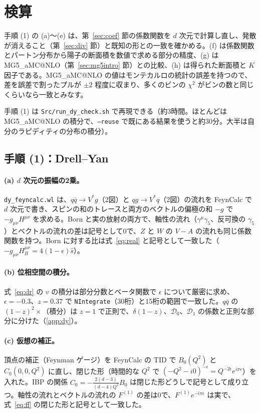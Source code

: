 \documentclass[a4paper,10pt]{ltjsarticle}
\makeatletter
\newcommand{\MGaMC}{MG5\_aMC@NLO}
\makeatother
\begin{document}
\section{検算}\label{sec:checks}

手順 (1) の (a)〜(e) は、第~\ref{sec:coef} 節の係数関数を $d$ 次元で計算し直し、発散が消えること（第~\ref{sec:div} 節）と既知の形との一致を確かめる。(f) は係数関数とパートン分布から陽子の断面積を数値で求める部分の精度、(g) は \MGaMC{}（第~\ref{sec:mg5intro} 節）との比較、(h) は得られた断面積と $K$ 因子である。\MGaMC{} の値はモンテカルロの統計の誤差を持つので、差を誤差で割ったプルが $\pm2$ 程度に収まり、多くのビンの $\chi^2$ がビンの数と同じくらいなら一致とみなす。

手順 (1) は \texttt{Src/run\_dy\_check.sh} で再現できる（約3時間。ほとんどは \MGaMC{} の積分で、\texttt{--reuse} で既にある結果を使うと約30分。大半は自分のラピディティの分布の積分）。

\subsection{手順 (1)：Drell--Yan}\label{sec:step1}

\paragraph{(a) $d$ 次元の振幅の2乗。}\texttt{dy\_feyncalc.wl} は、$q\bar q\to V^*g$（2図）と $qg\to V^*q$（2図）の流れを FeynCalc で $d$ 次元で書き、スピンの和のトレースと両方のベクトルの偏極の和 $-g$ で $-g_{\mu\nu}H^{\mu\nu}$ を求める。Born と実の放射の両方で、軸性の流れ（$\gamma^\mu\gamma_5$、反可換の $\gamma_5$）とベクトルの流れの差は記号として0で、$Z$ と $W$ の $V-A$ の流れも同じ係数関数を持つ。Born に対する比は式~\eqref{eq:real} と記号として一致した（$-g_{\mu\nu}H_B^{\mu\nu}=4(1-\epsilon)\hat s$）。

\paragraph{(b) 位相空間の積分。}式~\eqref{eq:dr} の $v$ の積分は部分分数とベータ関数で $\epsilon$ について厳密に求め、$\epsilon=-0.3$、$z=0.37$ で \texttt{NIntegrate}（30桁）と15桁の範囲で一致した。$q\bar q$ の $(1-z)^2\times$（積分）は $z=1$ で正則で、$\delta(1-z)$、$\mathcal D_0$、$\mathcal D_1$ の係数と正則な部分に分けた（\ref{app:dy}）。

\paragraph{(c) 仮想の補正。}頂点の補正（Feynman ゲージ）を FeynCalc の TID で $B_0(Q^2)$ と $C_0(0,0,Q^2)$ に直し、閉じた形（時間的な $Q^2$ で $(-Q^2-i0)^{-\epsilon}=Q^{-2\epsilon}e^{i\pi\epsilon}$）を入れた。IBP の関係 $C_0=-\frac{2(d-3)}{(d-4)Q^2}B_0$ は閉じた形どうしで記号として成り立つ。軸性の流れとベクトルの流れの $F^{(1)}$ の差は0で、$F^{(1)}e^{-i\pi\epsilon}$ は実で、式~\eqref{eq:ff} の閉じた形と記号として一致した。
\end{document}
